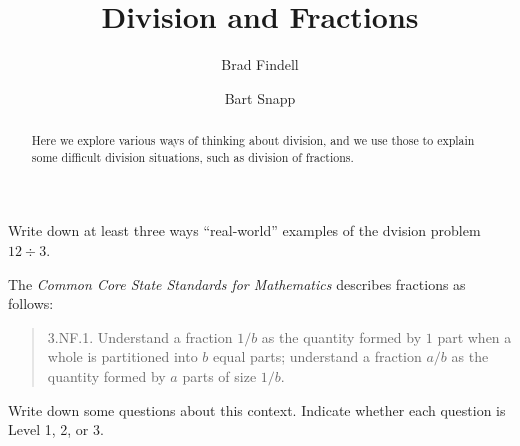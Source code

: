 \documentclass[handout]{ximera}
\author{Brad Findell \and Bart Snapp}
\title{Division and Fractions}
\begin{document}
\begin{abstract}
Here we explore various ways of thinking about division, and we use those to explain some difficult division situations, such as division of fractions.
\end{abstract}
\maketitle


\begin{problem}
Write down at least three ways ``real-world'' examples of the dvision problem $12\div 3$.  
\end{problem}

The \emph{Common Core State Standards for Mathematics} describes fractions as follows: 

\begin{quote}
3.NF.1. Understand a fraction $1/b$ as the quantity formed by $1$ part when a
whole is partitioned into $b$ equal parts; understand a fraction $a/b$ as
the quantity formed by $a$ parts of size $1/b$.
\end{quote}


\begin{problem}
Write down some questions about this context.  Indicate whether each question is Level 1, 2, or 3.  
\end{problem}

%
%
%
%
%
\end{document}
